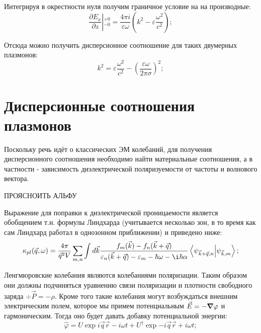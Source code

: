 \documentclass[../main.tex]{subfiles}
\begin{document}
    Интегрируя в окрестности нуля получим граничное условие на на производные:
    \begin{equation*}
        \left.\frac{\partial E_x}{\partial z}\right\vert{}^{+0}_{-0} = \frac{4\pi i}{\varepsilon \omega}
        \left(k^2  - \varepsilon \frac{\omega^2}{c^2}\right);
    \end{equation*}

    Отсюда можно получить дисперсионное соотношение для таких двумерных плазмонов:
    \begin{equation}
        \label{plasmons:edisp}
        k^2  = \varepsilon  \frac{\omega^2}{c^2} - \left(\frac{\varepsilon\omega}{2\pi \sigma}\right)^2;
    \end{equation}






    
    \section{Дисперсионные соотношения плазмонов}

    Поскольку речь идёт о классических ЭМ колебаний, 
    для получения дисперсионного соотношения необходимо найти 
    материальные соотношения, а в частности - зависимость 
    диэлектрической поляризуемости от частоты и волнового вектора.

    ПРОЯСНОИТЬ АЛЬФУ

    Выражение для поправки к диэлектрической проницаемости является 
    обобщением т.н. формулы Линдхарда (учитывается несколько зон, в то 
    время как сам Линдхард работал в однозонном приближении)
    и приведено ниже:
    \begin{equation}
        \label{lindhard}
        \kappa_{pl}(\vec q, \omega) = \frac{4\pi}{\vec{q}^2 V}
            \sum_{m, n} \int d\vec k \frac{f_m(\vec k) - f_n(\vec k 
                + \vec q)}{\varepsilon_n(\vec k + \vec q) - 
                \varepsilon_m - \hbar \omega - \i \hbar \alpha}
                \bra{\psi_{\vec k + \vec q,n}} \ket{\psi_{\vec k, m}};
    \end{equation}


    Ленгмюровские колебания являются колебаниями поляризации. Таким
    образом они должны подчиняться уравнению связи поляризации и 
    плотности свободного заряда $\div \vec P  = - \rho$. Кроме того 
    такие колебания могут возбуждаться внешним электрическим полем, 
    которое мы примем потенциальным $\vec E = - \grad \varphi$ и 
    гармоническим. Тогда оно будет давать добавку потенциальной энергии:
    \begin{equation}
        \label{plazmon:field}
        \hat \varphi  = U \exp{i\vec q \vec r - i \omega t}
            + U^{\dagger} \exp{-i\vec q\vec r + i \omega t};
    \end{equation}
\end{document}
